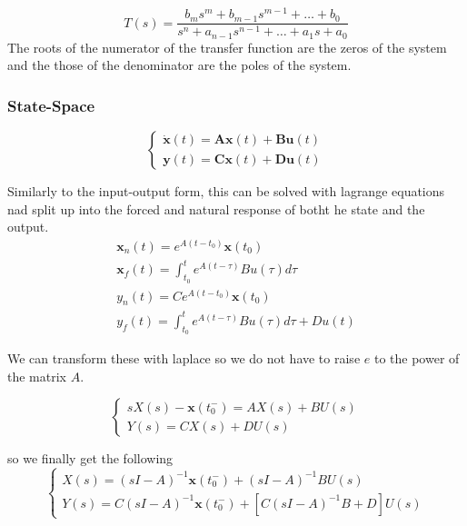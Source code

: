 \documentclass[11pt]{article}
\begin{document}
\begin{equation}
  T(s) = \frac{b_m s^m + b_{m-1} s^{m-1} + \dots + b_0}{s^n + a_{n-1} s^{n-1} + \dots + a_1s + a_0} 
\end{equation}
The roots of the numerator of the transfer function are the zeros of the system and the those of the denominator are the poles of the system.

\subsubsection{State-Space}
\begin{equation}
  \begin{cases}
    \dot{\textbf{x}} (t) = \textbf{A} \textbf{x} (t) + \textbf{B} \textbf{u} (t) \\
    \textbf{y}(t)  = \textbf{C} \textbf{x} (t) + \textbf{D} \textbf{u} (t)
  \end{cases}
\end{equation}

Similarly to the input-output form, this can be solved with lagrange equations nad split up into the forced and natural response of botht he state and the output.
\begin{gather}
  \textbf{x}_n (t) = e^{A(t-t_0)} \textbf{x} (t_0) \\
  \textbf{x}_f (t) = \int_{t_0}^{t} e^{A(t-\tau)} B u(\tau) d\tau \\
  y_n(t) = C e^{A(t-t_0)} \textbf{x} (t_0) \\
  y_f(t) = \int_{t_0}^{t} e^{A(t-\tau)} B u(\tau) d\tau + Du(t)
\end{gather}

We can transform these with laplace so we do not have to raise $e$ to the power of the matrix $A$.

\begin{equation}
  \begin{cases}
    sX(s) - \textbf{x} (t_0^-) = AX(s) + BU(s) \\
    Y(s) = CX(s) + DU(s)
  \end{cases}
\end{equation}

so we finally get the following
\begin{equation}
  \begin{cases}
    X(s) = (s I - A)^{-1} \textbf{x}(t_0^-) + (s I - A)^{-1} BU(s) \\
    Y(s) = C (s I - A)^{-1} \textbf{x}(t_0^-) + [C(s I - A)^{-1}B + D] U(s)
  \end{cases}
\end{equation}
\end{document}
